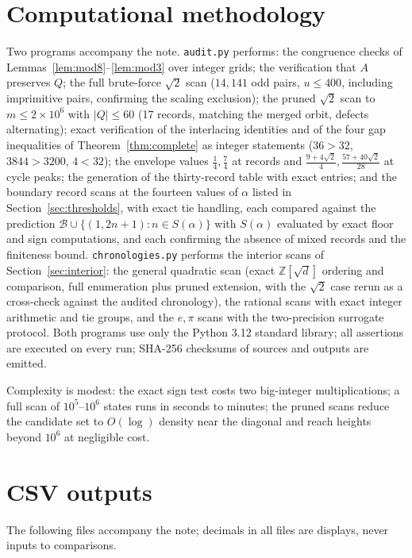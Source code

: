 \documentclass[11pt]{article}
\theoremstyle{definition}
\theoremstyle{remark}
\newcommand{\ZZ}{\mathbb{Z}}
\newcommand{\B}{\mathcal{B}}
\begin{document}
\appendix

\section{Computational methodology}\label{app:method}

Two programs accompany the note. \texttt{audit.py} performs: the congruence checks of Lemmas~\ref{lem:mod8}--\ref{lem:mod3} over integer grids; the verification that $A$ preserves $Q$; the full brute-force $\sqrt2$ scan ($14{,}141$ odd pairs, $u\le400$, including imprimitive pairs, confirming the scaling exclusion); the pruned $\sqrt2$ scan to $m\le2\times10^6$ with $|Q|\le60$ (17 records, matching the merged orbit, defects alternating); exact verification of the interlacing identities and of the four gap inequalities of Theorem~\ref{thm:complete} as integer statements ($36>32$, $3844>3200$, $4<32$); the envelope values $\tfrac14,\tfrac74$ at records and $\tfrac{9+4\sqrt2}4,\tfrac{57+40\sqrt2}{28}$ at cycle peaks; the generation of the thirty-record table with exact entries; and the boundary record scans at the fourteen values of $\alpha$ listed in Section~\ref{sec:thresholds}, with exact tie handling, each compared against the prediction $\B\cup\{(1,2n+1):n\in S(\alpha)\}$ with $S(\alpha)$ evaluated by exact floor and sign computations, and each confirming the absence of mixed records and the finiteness bound. \texttt{chronologies.py} performs the interior scans of Section~\ref{sec:interior}: the general quadratic scan (exact $\ZZ[\sqrt d]$ ordering and comparison, full enumeration plus pruned extension, with the $\sqrt2$ case rerun as a cross-check against the audited chronology), the rational scans with exact integer arithmetic and tie groups, and the $e,\pi$ scans with the two-precision surrogate protocol. Both programs use only the Python 3.12 standard library; all assertions are executed on every run; SHA-256 checksums of sources and outputs are emitted.

Complexity is modest: the exact sign test costs two big-integer multiplications; a full scan of $10^5$--$10^6$ states runs in seconds to minutes; the pruned scans reduce the candidate set to $O(\log)$ density near the diagonal and reach heights beyond $10^6$ at negligible cost.

\section{CSV outputs}\label{app:csv}

The following files accompany the note; decimals in all files are displays, never inputs to comparisons.
\end{document}
